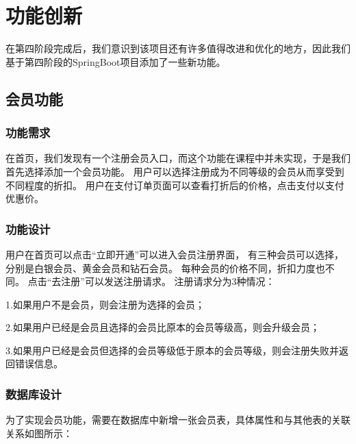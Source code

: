 
\chapter{功能创新}

在第四阶段完成后，我们意识到该项目还有许多值得改进和优化的地方，因此我们基于第四阶段的SpringBoot项目添加了一些新功能。~\\

\section{会员功能}
\subsection{功能需求}
在首页，我们发现有一个注册会员入口，而这个功能在课程中并未实现，于是我们首先选择添加一个会员功能。
用户可以选择注册成为不同等级的会员从而享受到不同程度的折扣。
用户在支付订单页面可以查看打折后的价格，点击支付以支付优惠价。~\\

\subsection{功能设计}
用户在首页可以点击“立即开通”可以进入会员注册界面，
有三种会员可以选择，分别是白银会员、黄金会员和钻石会员。
每种会员的价格不同，折扣力度也不同。
点击“去注册”可以发送注册请求。
注册请求分为3种情况：

1.如果用户不是会员，则会注册为选择的会员；

2.如果用户已经是会员且选择的会员比原本的会员等级高，则会升级会员；

3.如果用户已经是会员但选择的会员等级低于原本的会员等级，则会注册失败并返回错误信息。~\\

\subsection{数据库设计}
为了实现会员功能，需要在数据库中新增一张会员表，具体属性和与其他表的关联关系如图所示：

